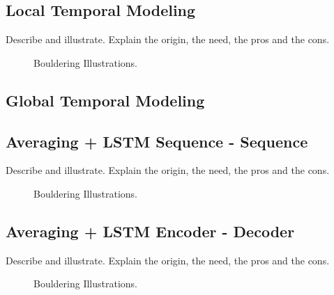 \subsection{Local Temporal Modeling}
Describe and illustrate. Explain the origin, the need, the pros and the cons.
\begin{figure}[h]
    \centering
    \caption{Bouldering Illustrations.}
\end{figure}

\subsection{Global Temporal Modeling}

\subsection{\textbf{Averaging + LSTM Sequence - Sequence}}
Describe and illustrate. Explain the origin, the need, the pros and the cons.
\begin{figure}[h]
    \centering
    \caption{Bouldering Illustrations.}
\end{figure}

\subsection{\textbf{Averaging + LSTM Encoder - Decoder}}
Describe and illustrate. Explain the origin, the need, the pros and the cons.
\begin{figure}[h]
    \centering
    \caption{Bouldering Illustrations.}
\end{figure}

